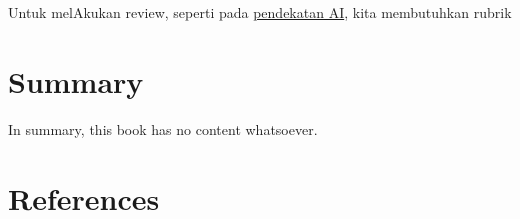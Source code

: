 \documentclass[
  letterpaper,
  DIV=11,
  numbers=noendperiod]{scrreprt}
\newlength{\cslhangindent}
\newenvironment{CSLReferences}[2] %
 {\begin{list}{}{%
  \setlength{\itemindent}{0pt}
  \setlength{\leftmargin}{0pt}
  \setlength{\parsep}{0pt}
  \ifodd #1
   \setlength{\leftmargin}{\cslhangindent}
   \setlength{\itemindent}{-1\cslhangindent}
  \fi
  \setlength{\itemsep}{#2\baselineskip}}}
 {\end{list}}
\begin{document}
Untuk melAkukan review, seperti pada
\href{../My_Personal_Reviews/Doc.5.Mengevaluasi-Esai-Berdasarkan-Rubrik.pdf}{pendekatan
AI}, kita membutuhkan rubrik


\chapter{Summary}\label{summary}

In summary, this book has no content whatsoever.


\chapter*{References}\label{references}


\label{refs}
\begin{CSLReferences}{0}{1}
\end{CSLReferences}
\end{document}

